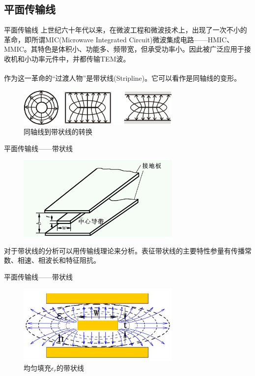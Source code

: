 \subsection{平面传输线}
\begin{frame}{平面传输线}
    上世纪六十年代以来，在微波工程和微波技术上，出现了一次不小的革命，即所谓MIC(Microwave Integrated Circuit)微波集成电路——HMIC、MMIC。其特色是体积小、功能多、频带宽，但承受功率小。因此被广泛应用于接收机和小功率元件中，并都传输TEM波。\\
    \hspace*{\fill}\\
    作为这一革命的“过渡人物”是带状线(Stripline)。它可以看作是同轴线的变形。
    \begin{figure}
        \includegraphics[width=8cm]{Cha6//fig6-32.png}
        \caption{同轴线到带状线的转换}
    \end{figure}
\end{frame}

\begin{frame}{平面传输线——带状线}
    \begin{figure}
        \includegraphics[width=8cm]{Cha6//fig6-33.png}
    \end{figure}
    对于带状线的分析可以用传输线理论来分析。表征带状线的主要特性参量有传播常数、相速、相波长和特征阻抗。
\end{frame}

\begin{frame}{平面传输线——带状线}
    \begin{figure}
        \includegraphics[width=8cm]{Cha6//fig6-34.png}
        \caption{均匀填充$\epsilon_r$的带状线}
    \end{figure}
\end{frame}

